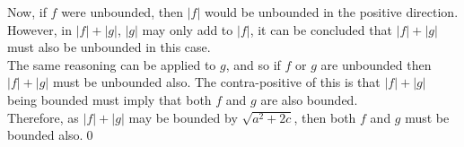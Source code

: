 \documentclass{amsart}
\begin{document}
Now, if $f$ were unbounded, then $|f|$ would be unbounded in the positive direction. However, in $|f|+|g|$, $|g|$ may only add to $|f|$, it can be concluded that $|f|+|g|$ must also be unbounded in this case.\\ The same reasoning can be applied to $g$, and so if $f$ or $g$ are unbounded then $|f| + |g|$ must be unbounded also. The contra-positive of this is that $|f|+|g|$ being bounded must imply that both $f$ and $g$ are also bounded.\\
Therefore, as $|f| + |g|$ may be bounded by $\sqrt{a^2 + 2c}$, then both $f$ and $g$ must be bounded also.\qed
\end{document}
